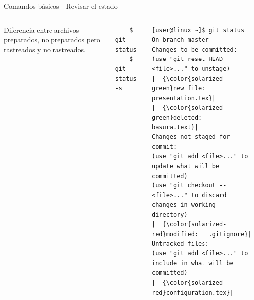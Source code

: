 \begin{frame}[fragile]{Comandos básicos - Revisar el estado}
  \begin{columns}[onlytextwidth]
  Diferencia entre archivos preparados, no preparados pero rastreados y no rastreados.
  \begin{verbatim}
    $ git status
    $ git status -s
  \end{verbatim}
  \vspace{0.3cm}
  \begin{verbatim}
[user@linux ~]$ git status
On branch master
Changes to be committed:
(use "git reset HEAD <file>..." to unstage)
|  {\color{solarized-green}new file:   presentation.tex}|
|  {\color{solarized-green}deleted:    basura.text}|
Changes not staged for commit:
(use "git add <file>..." to update what will be committed)
(use "git checkout -- <file>..." to discard changes in working directory)
|  {\color{solarized-red}modified:   .gitignore}|
Untracked files:
(use "git add <file>..." to include in what will be committed)
|  {\color{solarized-red}configuration.tex}|
  \end{verbatim}
  \end{columns}
\end{frame}


